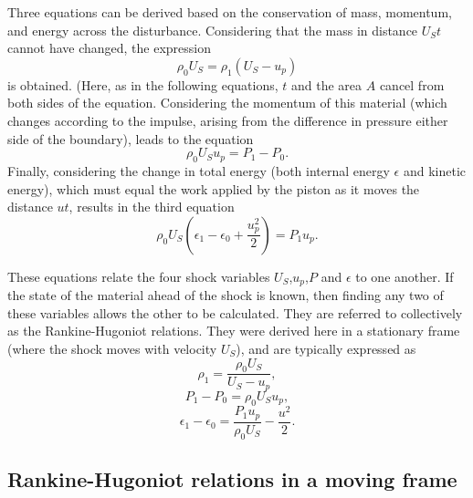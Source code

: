 Three equations can be derived based on the conservation of mass, momentum, and energy across the disturbance. Considering that the mass in distance $U_S t$ cannot have changed, the expression
\begin{equation} \rho_0 U_S = \rho_1 (U_S - u_p) \end{equation}
is obtained. (Here, as in the following equations, $t$ and the area $A$ cancel from both sides of the equation. Considering the momentum of this material (which changes according to the impulse, arising from the difference in pressure either side of the boundary), leads to the equation 
\begin{equation} \rho_0 U_S u_p = P_1 - P_0. \end{equation}
Finally, considering the change in total energy (both internal energy $\epsilon$ and kinetic energy), which must equal the work applied by the piston as it moves the distance $ut$, results in the third equation 
\begin{equation} \rho_0 U_S (\epsilon_1 - \epsilon_0 + \frac{u_p^2}{2}) = P_1 u_p. \end{equation}

These equations relate the four shock variables $U_S$,$u_p$,$P$ and $\epsilon$ to one another. If the state of the material ahead of the shock is known, then finding any two of these variables allows the other to be calculated. They are referred to collectively as the Rankine-Hugoniot relations. They were derived here in a stationary frame (where the shock moves with velocity $U_S$), and are typically expressed as
\begin{equation} \rho_1 = \frac{\rho_0 U_S}{U_S - u_p}, \label{eqn: RH1 stationary} \end{equation}
\begin{equation} P_1 - P_0 = \rho_0 U_S u_p, \label{eqn: RH2 stationary} \end{equation}
\begin{equation} \epsilon_1 - \epsilon_0 = \frac{P_1 u_p}{\rho_0 U_S} - \frac{u^2}{2}. \label{eqn: RH3 stationary} \end{equation}

\subsection{Rankine-Hugoniot relations in a moving frame}

